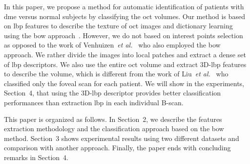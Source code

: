 In this paper, we propose a method for automatic identification of patients with \ac{dme} versus normal subjects by classifying the \ac{oct} volumes. Our method is based on \ac{lbp} features to describe the texture of \ac{oct} images and dictionary learning using the \ac{bow} approach~\cite{Sivic2003}.
However, we do not based on interest points selection as opposed to the work of Venhuizen~\textit{et al.}~\cite{Venhuizen2015} who also employed the \ac{bow} approach. We rather divide the images into local patches and extract a dense set of \ac{lbp} descriptors.
We also use the entire \ac{oct} volume and extract 3D-\ac{lbp} features to describe the volume, which is different from the work of Liu~\textit{et al.}~\cite{Liu2011} who classified only the foveal scan for each patient.
We will show in the experiments, Section~4, that using the 3D-\ac{lbp} descriptor provides better classification performances than extraction \ac{lbp} in each individual B-scan.

This paper is organized as follows. In Section~2, we describe the features extraction methodology and the classification approach based on the \ac{bow} method.
Section~3 shows experimental results using two different datasets and comparison with another approach. Finally, the paper ends with concluding remarks in Section~4.


